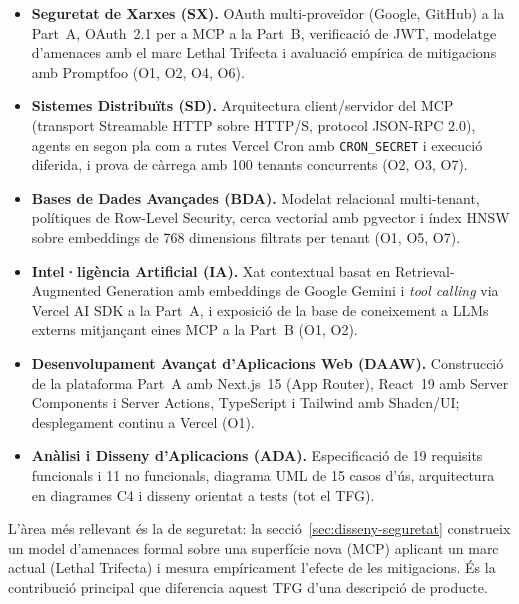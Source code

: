 \begin{itemize}
  \item \textbf{Seguretat de Xarxes (SX).} OAuth multi-proveïdor
    (Google, GitHub) a la Part~A, OAuth~2.1 per a MCP a la Part~B,
    verificació de JWT, modelatge d'amenaces amb el marc Lethal
    Trifecta i avaluació empírica de mitigacions amb Promptfoo
    (O1, O2, O4, O6).

  \item \textbf{Sistemes Distribuïts (SD).} Arquitectura
    client/servidor del MCP (transport Streamable HTTP sobre HTTP/S,
    protocol JSON-RPC 2.0), agents en segon pla com a rutes Vercel
    Cron amb \texttt{CRON\_SECRET} i execució diferida, i prova de
    càrrega amb 100 tenants concurrents (O2, O3, O7).

  \item \textbf{Bases de Dades Avançades (BDA).} Modelat relacional
    multi-tenant, polítiques de Row-Level Security, cerca vectorial
    amb pgvector i índex HNSW sobre embeddings de 768 dimensions
    filtrats per tenant (O1, O5, O7).

  \item \textbf{Intel·ligència Artificial (IA).} Xat contextual basat
    en Retrieval-Augmented Generation amb embeddings de Google Gemini
    i \emph{tool calling} via Vercel AI SDK a la Part~A, i exposició
    de la base de coneixement a LLMs externs mitjançant eines MCP a
    la Part~B (O1, O2).

  \item \textbf{Desenvolupament Avançat d'Aplicacions Web (DAAW).}
    Construcció de la plataforma Part~A amb Next.js~15 (App Router),
    React~19 amb Server Components i Server Actions, TypeScript i
    Tailwind amb Shadcn/UI; desplegament continu a Vercel (O1).

  \item \textbf{Anàlisi i Disseny d'Aplicacions (ADA).} Especificació
    de 19 requisits funcionals i 11 no funcionals, diagrama UML de
    15 casos d'ús, arquitectura en diagrames C4 i disseny orientat a
    tests (tot el TFG).
\end{itemize}

L'àrea més rellevant és la de seguretat: la secció~\ref{sec:disseny-seguretat} construeix un
model d'amenaces formal sobre una superfície nova (MCP) aplicant un marc
actual (Lethal Trifecta) i mesura empíricament l'efecte de les
mitigacions. És la contribució principal que diferencia aquest TFG d'una
descripció de producte.
